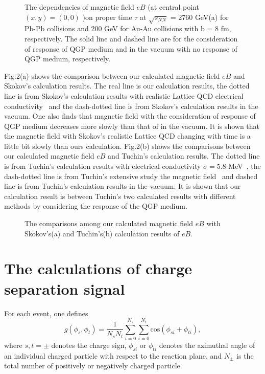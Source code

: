 \documentclass[twocolumn,showpacs,preprintnumbers,amsmath,amssymb]{revtex4}
\begin{document}
\begin{figure}[h!]
\centering {}
\caption{The dependencies of magnetic field $eB$ (at central point $(x, y) = (0, 0)$ )on proper time $\tau$ at $\sqrt{s_{NN}}$ = 2760 GeV(a) for Pb-Pb collisions
and 200 GeV for Au-Au collisions with b = 8 fm, respectively. The solid line and dashed line are for the consideration of response of QGP medium and in the vacuum with no
response of QGP medium, respectively.}
\label{fig1} %
\end{figure}

Fig.2(a) shows the comparison between our calculated magnetic field $eB$ and Skokov's calculation results. The real line is our calculation results, the dotted line is from Skokov's calculation results with realistic Lattice QCD electrical conductivity~\cite{lab19} and the dash-dotted line is from Skokov's calculation results in the vacuum. One also finds that magnetic field with the consideration of response of QGP medium decreases more slowly than that of in the vacuum. It is shown that the magnetic field with Skokov's realistic Lattice QCD changing with time is a little bit slowly than ours calculation. Fig.2(b) shows the comparisons between our calculated magnetic field $eB$ and Tuchin's calculation results. The dotted line is from Tuchin's calculation results with electrical conductivity $\sigma=5.8$ MeV~\cite{lab17}, the dash-dotted line is from Tuchin's  extensive study the magnetic field~\cite{lab21}
and dashed line is from Tuchin's calculation results in the vacuum.
It is shown that our calculation result is between Tuchin's two calculated results with different methods by considering the response of the QGP medium.


\hskip0.2cm

\begin{figure}[h!]
\centering {}
\caption{The comparisons among our calculated magnetic field $eB$ with Skokov's(a) and Tuchin's(b) calculation results of $eB$.}
\label{fig2} %
\end{figure}


\section{The calculations of charge separation signal }
For each event, one defines~\cite{lab29}
\begin{equation}
g(\phi_{s},\phi_{t})=\frac{1}{N_{s}N_{t}}\sum_{i=0}^{N_{s}}\sum_{i=0}^{N_{t}}\textrm{cos}(\phi_{si}+\phi_{ti}),
\label{eq:eq24} %
\end{equation}
where $s,t=\pm$ denotes the charge sign, $\phi_{si}$ or $\phi_{ti}$
denotes the azimuthal angle of an individual charged particle with respect to the reaction plane, and $N_{\pm}$ is the total number of positively or negatively charged particle.
\end{document}
